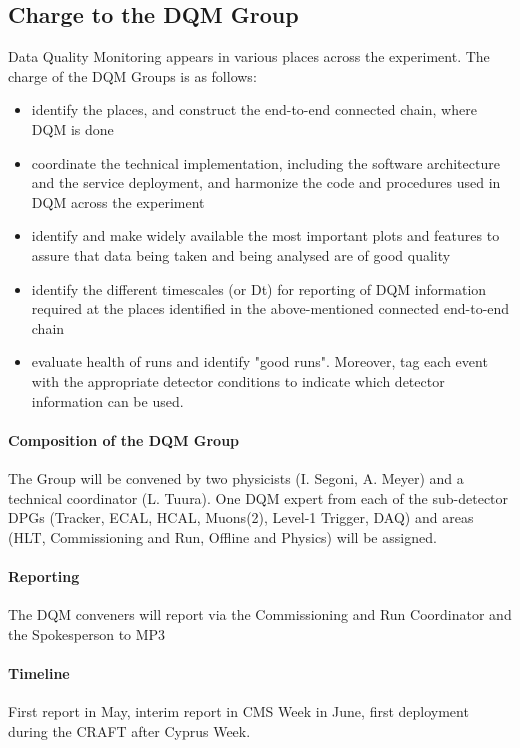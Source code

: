 \documentclass[a4paper]{cmspaper}
\begin{document}
\subsection{Charge to the DQM Group}
Data Quality Monitoring appears in various places across the experiment.
The charge of the DQM Groups is as follows:
\begin{itemize}
\item   identify the places, and construct the end-to-end connected chain, where DQM is done
\item   coordinate the technical implementation, including the software architecture and the service deployment, and harmonize the code and procedures used in DQM across the experiment
\item  identify and make widely available the most important plots and features to assure that data being taken and being analysed are of good quality
\item   identify the different timescales (or Dt) for reporting of DQM information required at the places identified in the above-mentioned connected end-to-end chain
\item  evaluate health of runs and identify "good runs". Moreover, tag each event with the appropriate detector conditions to indicate which detector information can be used.
\end{itemize}

\paragraph{Composition of the DQM Group}
The Group will be convened by two physicists (I. Segoni, A. Meyer) and a technical coordinator (L.
Tuura).
One DQM expert from each of the sub-detector DPGs (Tracker, ECAL, HCAL, Muons(2), Level-1 Trigger, DAQ) and areas (HLT, Commissioning and Run, Offline and Physics) will be assigned.


\paragraph{Reporting}
The DQM conveners will report via the Commissioning and Run Coordinator and the Spokesperson to MP3

\paragraph{Timeline}
First report in May, interim report in CMS Week in June, first deployment during the CRAFT after Cyprus Week.
\end{document}
